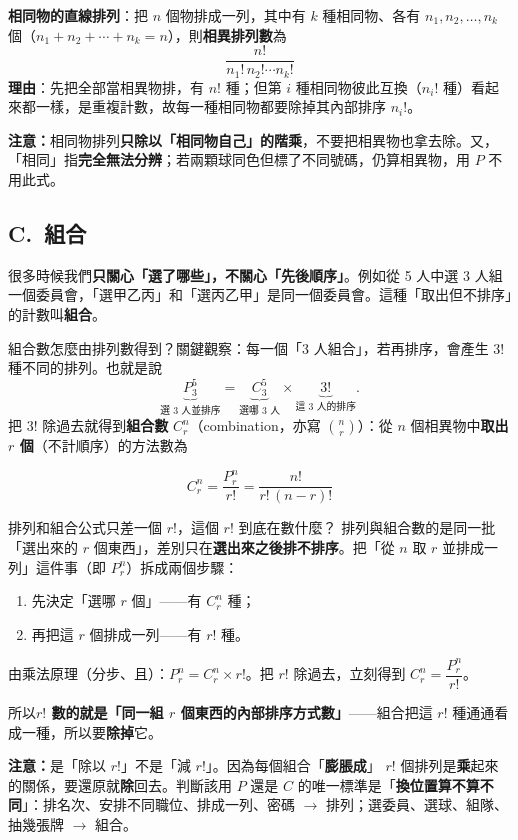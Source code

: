 \documentclass[11pt]{article}
\begin{document}
\textbf{相同物的直線排列}：把 $n$ 個物排成一列，其中有 $k$ 種相同物、各有 $n_1,n_2,\dots,n_k$ 個（$n_1+n_2+\cdots+n_k=n$），則\textbf{相異排列數}為
$$\boxed{\,\dfrac{n!}{n_1!\,n_2!\cdots n_k!}\,}$$
\textbf{理由}：先把全部當相異物排，有 $n!$ 種；但第 $i$ 種相同物彼此互換（$n_i!$ 種）看起來都一樣，是重複計數，故每一種相同物都要除掉其內部排序 $n_i!$。

\textbf{注意：}相同物排列\textbf{只除以「相同物自己」的階乘}，不要把相異物也拿去除。又，「相同」指\textbf{完全無法分辨}；若兩顆球同色但標了不同號碼，仍算相異物，用 $P$ 不用此式。

\subsection*{\sffamily C.\ 組合}

很多時候我們\textbf{只關心「選了哪些」，不關心「先後順序」}。例如從 5 人中選 3 人組一個委員會，「選甲乙丙」和「選丙乙甲」是同一個委員會。這種「取出但不排序」的計數叫\textbf{組合}。

組合數怎麼由排列數得到？關鍵觀察：每一個「3 人組合」，若再排序，會產生 $3!$ 種不同的排列。也就是說
$$\underbrace{P^5_3}_{\text{選 3 人並排序}} = \underbrace{C^5_3}_{\text{選哪 3 人}}\times\underbrace{3!}_{\text{這 3 人的排序}}.$$
把 $3!$ 除過去就得到\textbf{組合數} $C^n_r$（combination，亦寫 $\binom{n}{r}$）：從 $n$ 個相異物中\textbf{取出 $r$ 個}（不計順序）的方法數為

$$\boxed{\,C^n_r = \dfrac{P^n_r}{r!} = \dfrac{n!}{r!\,(n-r)!}\,}$$


\begin{補充框}{排列和組合公式只差一個 $r!$，這個 $r!$ 到底在數什麼？}
排列與組合數的是同一批「選出來的 $r$ 個東西」，差別只在\textbf{選出來之後排不排序}。把「從 $n$ 取 $r$ 並排成一列」這件事（即 $P^n_r$）拆成兩個步驟：
\begin{enumerate}\setlength{\itemsep}{1pt}
\item 先決定「選哪 $r$ 個」——有 $C^n_r$ 種；
\item 再把這 $r$ 個排成一列——有 $r!$ 種。
\end{enumerate}
由乘法原理（分步、且）：$P^n_r = C^n_r \times r!$。把 $r!$ 除過去，立刻得到 $C^n_r=\dfrac{P^n_r}{r!}$。

所以\textbf{$r!$ 數的就是「同一組 $r$ 個東西的內部排序方式數」}——組合把這 $r!$ 種通通看成一種，所以要\textbf{除掉}它。

\textbf{注意：}是「除以 $r!$」不是「減 $r!$」。因為每個組合「\textbf{膨脹成}」 $r!$ 個排列是\textbf{乘}起來的關係，要還原就\textbf{除}回去。判斷該用 $P$ 還是 $C$ 的唯一標準是「\textbf{換位置算不算不同}」：排名次、安排不同職位、排成一列、密碼 $\rightarrow$ 排列；選委員、選球、組隊、抽幾張牌 $\rightarrow$ 組合。
\end{補充框}
\end{document}
